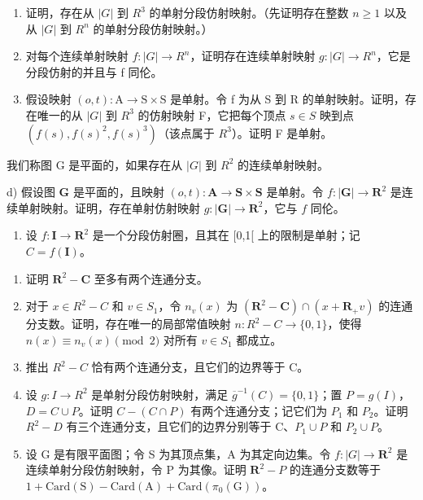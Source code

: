 \begin{enumerate}
\def\labelenumi{\alph{enumi})}
\item
   证明，存在从 \(|G|\) 到 \(R^{3}\) 的单射分段仿射映射。（先证明存在整数 \(n \geqslant 1\) 以及从 \(|G|\) 到 \(R^{n}\) 的单射分段仿射映射。）
\item
   对每个连续单射映射 \(f\colon|G|\to R^{n}\)，证明存在连续单射映射 \(g\colon|G|\to R^{n}\)，它是分段仿射的并且与 f 同伦。
\item
   假设映射 \((o,t)\colon\mathrm{A}\to\mathrm{S}\times\mathrm{S}\) 是单射。令 f 为从 S 到 R 的单射映射。证明，存在唯一的从 \(|G|\) 到 \(R^{3}\) 的仿射映射 F，它把每个顶点 \(s\in S\) 映到点 \((f(s),f(s)^{2},f(s)^{3})\)（该点属于 \(R^{3}\)）。证明 F 是单射。
\end{enumerate}

我们称图 G 是平面的，如果存在从 \(|G|\) 到 \(R^{2}\) 的连续单射映射。

d) 假设图 \(\mathbf{G}\) 是平面的，且映射 \((o,t)\colon\mathbf{A}\to\mathbf{S}\times\mathbf{S}\) 是单射。令 \(f\colon|\mathbf{G}|\to\mathbf{R}^{2}\) 是连续单射映射。证明，存在单射仿射映射 \(g\colon|\mathbf{G}|\to\mathbf{R}^{2}\)，它与 \(f\) 同伦。

\begin{enumerate}
\def\labelenumi{\arabic{enumi})}
\setcounter{enumi}{19}
\tightlist
\item
   设 \(f \colon \mathbf{I} \to \mathbf{R}^2\) 是一个分段仿射圈，且其在 [0,1[ 上的限制是单射；记 \(C = f(\mathbf{I})\)。
\end{enumerate}

\begin{enumerate}
\def\labelenumi{\alph{enumi})}
\item
   证明 \(\mathbf{R}^2 -\mathbf{C}\) 至多有两个连通分支。
\item
   对于 \(x \in R^{2} - C\) 和 \(v \in S_{1}\)，令 \(n_{v}(x)\) 为 \((\mathbf{R}^{2} - \mathbf{C}) \cap (x + \mathbf{R}_{+}v)\) 的连通分支数。证明，存在唯一的局部常值映射 \(n: R^{2} - C \to \{0,1\}\)，使得 \(n(x) \equiv n_{v}(x) \pmod{2}\) 对所有 \(v \in S_{1}\) 都成立。
\item
   推出 \(R^{2}-C\) 恰有两个连通分支，且它们的边界等于 C。
\item
   设 \(g: I \to R^{2}\) 是单射分段仿射映射，满足 \(\overline{g}^{-1}(C) = \{0,1\}\)；置 \(P = g(I)\)，\(D = C \cup P\)。证明 \(C - (C \cap P)\) 有两个连通分支；记它们为 \(P_{1}\) 和 \(P_{2}\)。证明 \(R^{2} - D\) 有三个连通分支，且它们的边界分别等于 C、\(P_{1} \cup P\) 和 \(P_{2} \cup P\)。
\item
   设 G 是有限平面图；令 S 为其顶点集，A 为其定向边集。令 \(f\colon|G|\to\mathbf{R}^{2}\) 是连续单射分段仿射映射，令 P 为其像。证明 \(\mathbf{R}^{2}-P\) 的连通分支数等于 \(1+\mathrm{Card(S)}-\mathrm{Card(A)}+\mathrm{Card}(\pi_{0}(\mathrm{G}))\)。
\end{enumerate}

